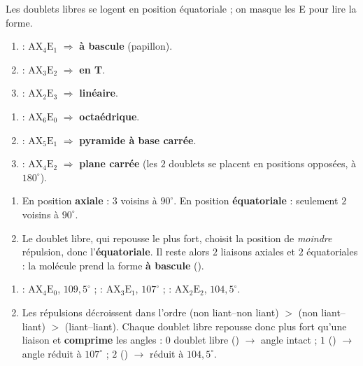 \documentclass[11pt,a4paper]{article}
\begin{document}
\newcommand{\AX}[2]{\ensuremath{\mathrm{AX_{#1}E_{#2}}}}
\begin{corrige}
Les doublets libres se logent en position équatoriale ; on masque les E pour lire la forme.
\begin{enumerate}[label=\alph*)]
  \item {} : \AX{4}{1} $\Rightarrow$ \textbf{à bascule} (papillon).
  \item {} : \AX{3}{2} $\Rightarrow$ \textbf{en T}.
  \item {} : \AX{2}{3} $\Rightarrow$ \textbf{linéaire}.
\end{enumerate}
\end{corrige}

\begin{corrige}
\begin{enumerate}[label=\alph*)]
  \item {} : \AX{6}{0} $\Rightarrow$ \textbf{octaédrique}.
  \item {} : \AX{5}{1} $\Rightarrow$ \textbf{pyramide à base carrée}.
  \item {} : \AX{4}{2} $\Rightarrow$ \textbf{plane carrée} (les $2$ doublets se placent en
        positions opposées, à $180^\circ$).
\end{enumerate}
\end{corrige}

\begin{corrige}
\begin{enumerate}[label=\alph*)]
  \item En position \textbf{axiale} : $3$ voisins à $90^\circ$. En position \textbf{équatoriale} :
        seulement $2$ voisins à $90^\circ$.
  \item Le doublet libre, qui repousse le plus fort, choisit la position de \emph{moindre}
        répulsion, donc l'\textbf{équatoriale}. Il reste alors $2$ liaisons axiales et $2$
        équatoriales : la molécule prend la forme \textbf{à bascule} ().
\end{enumerate}
\end{corrige}

\begin{corrige}
\begin{enumerate}[label=\alph*)]
  \item {} : \AX{4}{0}, $109{,}5^\circ$ ;  : \AX{3}{1}, $107^\circ$ ;  :
        \AX{2}{2}, $104{,}5^\circ$.
  \item Les répulsions décroissent dans l'ordre (non liant--non liant) $>$ (non liant--liant) $>$
        (liant--liant). Chaque doublet libre repousse donc plus fort qu'une liaison et
        \textbf{comprime} les angles : $0$ doublet libre () $\to$ angle intact ;
        $1$ () $\to$ angle réduit à $107^\circ$ ; $2$ () $\to$ réduit à
        $104{,}5^\circ$.
\end{enumerate}
\end{corrige}
\end{document}
